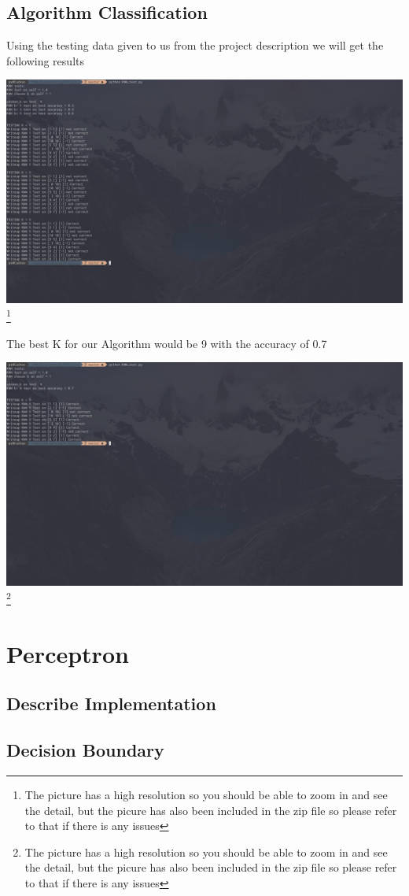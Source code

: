 \documentclass{article}
\begin{document}
	\subsection{Algorithm Classification}
	
	Using the testing data given to us from the project description we will get the following results 
\begin{center}
\includegraphics[scale=.24]{KNN.jpg}
	\footnote{The picture has a high resolution so you should be able to zoom in and see the detail, but the picure has also been included in the zip file so please refer to that if there is any issues}
	
\end{center}
	The best K for our Algorithm would be 9 with the accuracy of 0.7
	\begin{center}
		\includegraphics[scale=.24]{KNN2.jpg}
		\footnote{The picture has a high resolution so you should be able to zoom in and see the detail, but the picure has also been included in the zip file so please refer to that if there is any issues}
		
	\end{center}

	\section{Perceptron}
	\subsection{Describe Implementation}
	\subsection{Decision Boundary}
\end{document}
